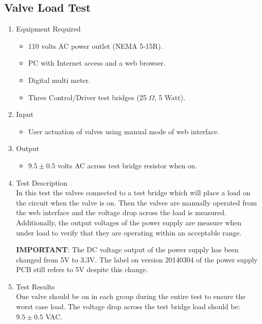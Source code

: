 \documentclass{article}
\begin{document}
\clearpage
\subsection{Valve Load Test}

\begin{enumerate}
\item Equipment Required
	\begin{itemize}
	\item 110 volts AC power outlet (NEMA 5-15R).
	\item PC with Internet access and a web browser.
	\item Digital multi meter.
	\item Three Control/Driver test bridges (25 $\Omega$, 5 Watt).
	\end{itemize}
\item Input
	\begin{itemize}
	\item User actuation of valves using manual mode of web interface.
	\end{itemize}
\item Output
	\begin{itemize}
	\item $9.5\pm0.5$ volts AC across test bridge resistor when on.
	\end{itemize}

\pagebreak
\item Test Description \\

In this test the valves connected to a test bridge which will place
a load on the circuit when the valve is on.
Then the valves are manually operated from the web interface and
the voltage drop across the load is measured.
Additionally, the output voltages of the power supply are measure
when under load to verify that they are operating within an acceptable range.

\begin{framed}
\textbf{IMPORTANT}: The DC voltage output of the power supply has
been changed from 5V to 3.3V.
The label on version 20140304 of the power supply PCB still
refers to 5V despite this change.
\end{framed}

\item Test Results \\
	\vspace{1em}
	One valve should be on in each group during the entire test
	to ensure the worst case load.
	The voltage drop across the test bridge load should be: $9.5\pm0.5$ VAC. \\
	\vspace{1em}


\end{enumerate}
\end{document}
